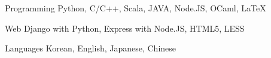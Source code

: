

\begin{cvskills}

  \cvskill
    {Programming} %
    {Python, C/C++, Scala, JAVA, Node.JS, OCaml, LaTeX} %

  \cvskill
    {Web} %
    {Django with Python, Express with Node.JS, HTML5, LESS} %

  \cvskill
    {Languages} %
    {Korean, English, Japanese, Chinese} %

\end{cvskills}

\begin{multicols}{2}
\givenskill
\giventextskill

\givenskill
\giventextskill
\newline
\end{multicols}